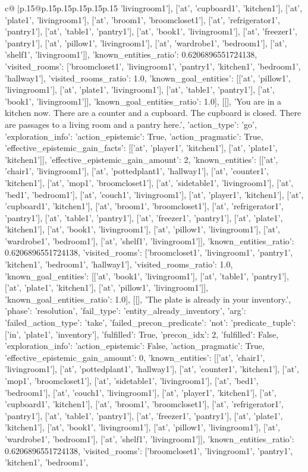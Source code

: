 \documentclass{article}
\begin{document}
{\begin{supertabular}{c@{$\;$}|p{.15\linewidth}@{}p{.15\linewidth}p{.15\linewidth}p{.15\linewidth}p{.15\linewidth}p{.15\linewidth}}
{{{'livingroom1'], ['at', 'cupboard1', 'kitchen1'], ['at', 'plate1', 'livingroom1'], ['at', 'broom1', 'broomcloset1'], ['at', 'refrigerator1', 'pantry1'], ['at', 'table1', 'pantry1'], ['at', 'book1', 'livingroom1'], ['at', 'freezer1', 'pantry1'], ['at', 'pillow1', 'livingroom1'], ['at', 'wardrobe1', 'bedroom1'], ['at', 'shelf1', 'livingroom1']], 'known_entities_ratio': 0.6206896551724138, 'visited_rooms': ['broomcloset1', 'livingroom1', 'pantry1', 'kitchen1', 'bedroom1', 'hallway1'], 'visited_rooms_ratio': 1.0, 'known_goal_entities': [['at', 'pillow1', 'livingroom1'], ['at', 'plate1', 'livingroom1'], ['at', 'table1', 'pantry1'], ['at', 'book1', 'livingroom1']], 'known_goal_entities_ratio': 1.0}}], [[], 'You are in a kitchen now. There are a counter and a cupboard. The cupboard is closed. There are passages to a living room and a pantry here.', {'action_type': 'go', 'exploration_info': {'action_epistemic': True, 'action_pragmatic': True, 'effective_epistemic_gain_facts': [['at', 'player1', 'kitchen1'], ['at', 'plate1', 'kitchen1']], 'effective_epistemic_gain_amount': 2, 'known_entities': [['at', 'chair1', 'livingroom1'], ['at', 'pottedplant1', 'hallway1'], ['at', 'counter1', 'kitchen1'], ['at', 'mop1', 'broomcloset1'], ['at', 'sidetable1', 'livingroom1'], ['at', 'bed1', 'bedroom1'], ['at', 'couch1', 'livingroom1'], ['at', 'player1', 'kitchen1'], ['at', 'cupboard1', 'kitchen1'], ['at', 'broom1', 'broomcloset1'], ['at', 'refrigerator1', 'pantry1'], ['at', 'table1', 'pantry1'], ['at', 'freezer1', 'pantry1'], ['at', 'plate1', 'kitchen1'], ['at', 'book1', 'livingroom1'], ['at', 'pillow1', 'livingroom1'], ['at', 'wardrobe1', 'bedroom1'], ['at', 'shelf1', 'livingroom1']], 'known_entities_ratio': 0.6206896551724138, 'visited_rooms': ['broomcloset1', 'livingroom1', 'pantry1', 'kitchen1', 'bedroom1', 'hallway1'], 'visited_rooms_ratio': 1.0, 'known_goal_entities': [['at', 'book1', 'livingroom1'], ['at', 'table1', 'pantry1'], ['at', 'plate1', 'kitchen1'], ['at', 'pillow1', 'livingroom1']], 'known_goal_entities_ratio': 1.0}}], [[], 'The plate is already in your inventory.', {'phase': 'resolution', 'fail_type': 'entity_already_inventory', 'arg': {'failed_action_type': 'take', 'failed_precon_predicate': {'not': {'predicate_tuple': ['in', 'plate1', 'inventory'], 'fulfilled': True, 'precon_idx': 2}, 'fulfilled': False}}, 'exploration_info': {'action_epistemic': False, 'action_pragmatic': True, 'effective_epistemic_gain_amount': 0, 'known_entities': [['at', 'chair1', 'livingroom1'], ['at', 'pottedplant1', 'hallway1'], ['at', 'counter1', 'kitchen1'], ['at', 'mop1', 'broomcloset1'], ['at', 'sidetable1', 'livingroom1'], ['at', 'bed1', 'bedroom1'], ['at', 'couch1', 'livingroom1'], ['at', 'player1', 'kitchen1'], ['at', 'cupboard1', 'kitchen1'], ['at', 'broom1', 'broomcloset1'], ['at', 'refrigerator1', 'pantry1'], ['at', 'table1', 'pantry1'], ['at', 'freezer1', 'pantry1'], ['at', 'plate1', 'kitchen1'], ['at', 'book1', 'livingroom1'], ['at', 'pillow1', 'livingroom1'], ['at', 'wardrobe1', 'bedroom1'], ['at', 'shelf1', 'livingroom1']], 'known_entities_ratio': 0.6206896551724138, 'visited_rooms': ['broomcloset1', 'livingroom1', 'pantry1', 'kitchen1', 'bedroom1', }}}
\end{supertabular}}
\end{document}
